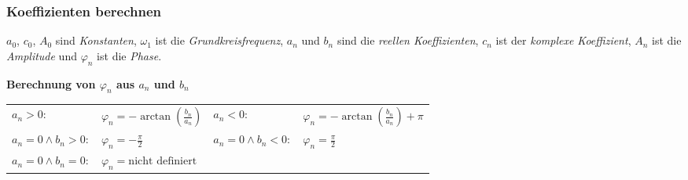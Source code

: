 \subsubsection{Koeffizienten berechnen}
$a_0$, $c_0$, $A_0$ sind \textit{Konstanten}, $\omega_1$ ist die
\textit{Grundkreisfrequenz}, $a_n$ und $b_n$ sind die \textit{reellen
	Koeffizienten}, $c_n$ ist der \textit{komplexe Koeffizient}, $A_n$ ist die
\textit{Amplitude} und $\varphi_n$ ist die \textit{Phase}.\\
\begin{center}
\end{center}
\textbf{Berechnung von $\varphi_n$ aus $a_n$ und $b_n$}\\
\begin{tabular}{p{4cm}p{4cm}p{3cm}p{3.5cm}}
	$a_n> 0:$ & $\varphi_n = -\arctan(\frac{b_n}{a_n})$ &
	$a_n<0:$ &	$\varphi_n = -\arctan(\frac{b_n}{a_n}) + \pi$\\
	$a_n = 0 \wedge b_n > 0:$ &	$\varphi_n = -\frac{\pi}{2}$ &
	$a_n = 0 \wedge b_n < 0:$ &	$\varphi_n = \frac{\pi}{2}$\\
	$a_n = 0 \wedge b_n = 0:$ &	$\varphi_n = \text{nicht definiert}$
\end{tabular}

